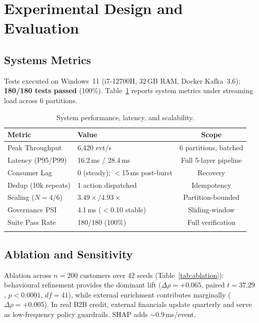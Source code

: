 \documentclass[pdflatex,sn-mathphys-num]{sn-jnl}
\theoremstyle{thmstyleone}
\theoremstyle{thmstyletwo}
\theoremstyle{thmstylethree}
\begin{document}
\section{Experimental Design and Evaluation}\label{sec:experiments}

\subsection{Systems Metrics}\label{subsec:sysmetrics}

Tests executed on Windows~11 (i7-12700H, 32\,GB RAM, Docker Kafka~3.6): \textbf{180/180 tests passed} (100\%). Table~\ref{tab:perf} reports system metrics under streaming load across 6 partitions.

\begin{table}[htbp]
\caption{System performance, latency, and scalability.}\label{tab:perf}
\centering\footnotesize
\begin{tabular}{@{}llc@{}}
\toprule
\textbf{Metric} & \textbf{Value} & \textbf{Scope} \\
\midrule
Peak Throughput        & 6{,}420 evt/s             & 6 partitions, batched \\
Latency (P95/P99)      & 16.2\,ms / 28.4\,ms      & Full 5-layer pipeline \\
Consumer Lag           & 0 (steady); $<$15\,ms post-burst & Recovery \\
Dedup (10k repeats)    & 1 action dispatched       & Idempotency \\
Scaling ($N{=}4/6$)    & $3.49{\times}/4.93{\times}$ & Partition-bounded \\
Governance PSI         & 4.1\,ms ($<$0.10 stable)  & Sliding-window \\
Suite Pass Rate        & 180/180 (100\%)           & Full verification \\
\botrule
\end{tabular}
\end{table}

\subsection{Ablation and Sensitivity}\label{subsec:ablation}

Ablation across $n{=}200$ customers over 42 seeds (Table~\ref{tab:ablation}): behavioural refinement provides the dominant lift ($\Delta\rho{=}+0.065$, paired $t{=}37.29$, $p{<}0.0001$, $df{=}41$), while external enrichment contributes marginally ($\Delta\rho{=}+0.005$). In real B2B credit, external financials update quarterly and serve as low-frequency policy guardrails. SHAP adds ${\sim}0.9$\,ms/event.
\end{document}
